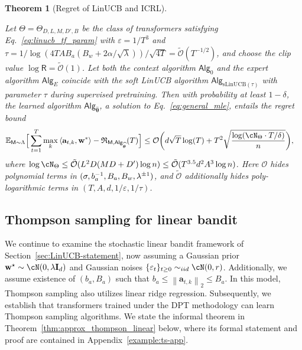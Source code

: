 \documentclass[10pt]{article}
\newtheorem{theorem}{Theorem}
\newcommand{\id}{\bI}
\newcommand{\eps}{\varepsilon}
\newcommand{\norm}[1]{\left\|{#1}\right\|}
\newcommand{\ltwo}[1]{\norm{#1}_2}
\renewcommand{\cO}{\mathcal{O}}
\newcommand{\<}{\left\langle}
\renewcommand{\>}{\right\rangle}
\newcommand{\mat}[1]{\ensuremath{\mathbf{#1}}}
\newcommand{\E}{\mathbb{E}}
\newcommand{\B}{\mat{B}}
\newcommand{\inst}{{\mathsf{M}}}
\newcommand{\sLinUCB}{{\mathrm{sLinUCB}}}
\newcommand{\temp}{{\tau}}
\newcommand{\Tpspar}{{\lambda}}
\newcommand{\Tpsparn}{{r}}
\newcommand{\tcO}{{\tilde{\mathcal O}}}
\newcommand{\totlen}{{T}}
\newcommand{\sAlg}{{\mathsf{Alg}}}
\newcommand{\Numobs}{{n}}
\newcommand{\Parspace}{{\Theta}}
\newcommand{\esttfpar}{{\widehat{\btheta}}}
\newcommand{\prior}{{\Lambda}}
\newcommand{\shortexp}{{E}}
\newcommand{\layer}{{L}}
\newcommand{\hidden}{{D'}}
\newcommand{\head}{{M}}
\newcommand{\clipval}{{\mathsf{R}}}
\newcommand{\embd}{{D}}
\newcommand{\totreward}{{\mathfrak{R}}}
\newcommand{\Numact}{{A}}
\def\bI{{\mathbf I}}
\def\btheta{{\boldsymbol \theta}}
\def\ba{{\mathbf a}}
\def\bw{{\mathbf w}}
\begin{document}
\begin{theorem}[Regret of LinUCB and ICRL]\label{thm:smooth_linucb}






Let $\Theta = \Theta_{D, L, M, \hidden, B}$ be the class of transformers satisfying Eq.~\eqref{eq:linucb_tf_param} with $\eps=1/\totlen^3$ and $\temp = 1/ \log(4\totlen\Numact B_a(B_w+2\alpha/\sqrt{\lambda}))/\sqrt{4\totlen}=\tcO(\totlen^{-1/2})$, and choose the clip value $\log\clipval = \tcO(1)$. Let both the context algorithm $\sAlg_0$ and the expert algorithm $\sAlg_\shortexp$ coincide with the soft LinUCB algorithm $\sAlg_{\sLinUCB(\tau)}$ with parameter $\tau$ during supervised pretraining. Then with probability at least $1-\delta$, the learned algorithm $\sAlg_{\esttfpar}$, a solution to Eq.~\eqref{eq:general_mle}, entails the regret bound
\begin{align*}
\E_{\inst\sim\prior}\Big[\sum_{t=1}^\totlen\max_{k}\<\ba_{t,k},\bw^*\>-\totreward_{\inst,\sAlg_\esttfpar}(\totlen)\Big]&\leq   \cO\bigg( d\sqrt{\totlen}\log(\totlen)+ \totlen^2\sqrt{\frac{\log ( \cN_{\Parspace} \cdot \totlen/\delta )}{n} } \bigg),

\end{align*}
where $\log \cN_{\Parspace} \le \tcO(\layer^2\embd(\head\embd+\hidden) \log\Numobs) \leq \tcO(\totlen^{3.5} d^2 \Numact^3\log\Numobs)$. Here $\cO$ hides polynomial terms in $(\sigma, b_a^{-1}, B_a, \\B_w, \lambda^{\pm1})$, and $\tcO$ additionally hides poly-logarithmic terms in $(\totlen, \Numact, d, 1/\eps,1/\temp)$.
\end{theorem}




\subsection{Thompson sampling for linear bandit}\label{sec:TS-statement}


We continue to examine the stochastic linear bandit framework of Section~\ref{sec:LinUCB-statement}, now assuming a Gaussian prior $\bw^\star\sim \cN(0,\Tpspar\id_d)$ and Gaussian noises $\{ \eps_t \}_{t \ge 0} \sim_{iid} \cN(0,\Tpsparn)$. Additionally, we assume existence of $(b_a, B_a)$ such that $b_a\leq\ltwo{\ba_{t,k}}\leq B_a$. In this model, Thompson sampling also utilizes linear ridge regression. Subsequently, we establish that transformers trained under the DPT methodology can learn Thompson sampling algorithms. We state the informal theorem in Theorem~\ref{thm:approx_thompson_linear} below, where its formal statement and proof are contained in Appendix~\ref{example:ts-app}.
\end{document}
